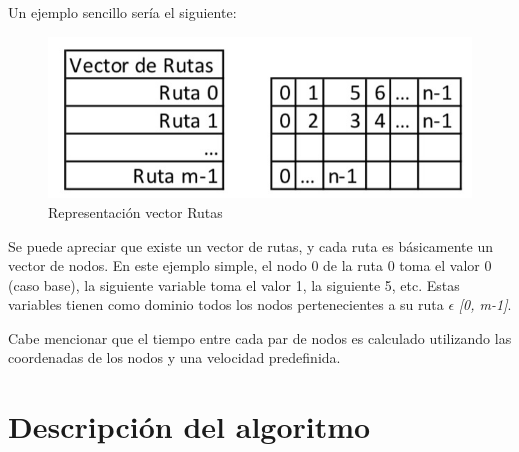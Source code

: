 \documentclass[letter, 10pt]{article}
\begin{document}
Un ejemplo sencillo sería el siguiente:

\begin{figure}[ht]
    \centering
    \includegraphics[scale=0.3]{figura1.jpg}
    \caption{Representación vector Rutas}
    \label{fig:my_label}
\end{figure}

Se puede apreciar que existe un vector de rutas, y cada ruta es básicamente un vector de nodos. En este ejemplo simple, el nodo 0 de la ruta 0 toma el valor 0 (caso base), la siguiente variable toma el valor 1, la siguiente 5, etc. Estas variables tienen como dominio todos los nodos pertenecientes a su ruta $\epsilon$ \textit{[0, m-1]}. 

Cabe mencionar que el tiempo entre cada par de nodos es calculado utilizando las coordenadas de los nodos y una velocidad predefinida. 


\section{Descripci\'on del algoritmo}
\end{document}
